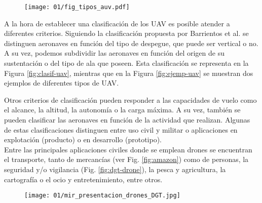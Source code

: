 \documentclass[../main.tex]{subfiles}
\begin{document}
\begin{figure}[!h]
 	{\texttt{[image: 01/fig\_tipos\_auv.pdf]}}
\end{figure}

\newpage
A la hora de establecer una clasificación de los UAV es posible atender a diferentes criterios. Siguiendo la clasificación propuesta por Barrientos et al. \cite{barrientos2007vehiculos} se distinguen aeronaves en función del tipo de despegue, que puede ser vertical o no. A su vez, podemos subdividir las aeronaves en función del origen de su sustentación o del tipo de ala que poseen. Esta clasificación se representa en la Figura \ref{fig:clasif-uav}, mientras que en la Figura \ref{fig:ejemp-uav} se muestran dos ejemplos de diferentes tipos de UAV.

\begin{figure}[ht]
\end{figure}

Otros criterios de clasificación pueden responder a las capacidades de vuelo como el alcance, la altitud, la autonomía o la carga máxima. A su vez, también se pueden clasificar las aeronaves en función de la actividad que realizan. Algunas de estas clasificaciones distinguen entre uso civil y militar o aplicaciones en explotación (producto) o en desarrollo (prototipo). \\
Entre las principales aplicaciones civiles donde se emplean drones se encuentran el transporte, tanto de mercancías (ver Fig. \ref{fig:amazon}) como de personas, la seguridad y/o vigilancia (Fig. \ref{fig:dgt-drone}), la pesca y agricultura, la cartografía o el ocio y entretenimiento, entre otros.

\begin{figure}[ht]
 	{\texttt{[image: 01/mir\_presentacion\_drones\_DGT.jpg]}}
\end{figure}
\end{document}
